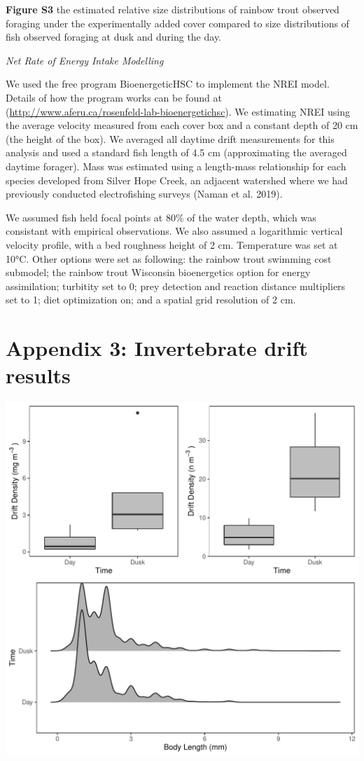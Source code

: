 \documentclass[]{article}
\begin{document}
\textbf{Figure S3} the estimated relative size distributions of rainbow
trout observed foraging under the experimentally added cover compared to
size distributions of fish observed foraging at dusk and during the day.

\emph{Net Rate of Energy Intake Modelling}

We used the free program BioenergeticHSC to implement the NREI model.
Details of how the program works can be found at
(\url{http://www.aferu.ca/rosenfeld-lab-bioenergetichsc}). We estimating
NREI using the average velocity measured from each cover box and a
constant depth of 20 cm (the height of the box). We averaged all daytime
drift measurements for this analysis and used a standard fish length of
4.5 cm (approximating the averaged daytime forager). Mass was estimated
using a length-mass relationship for each species developed from Silver
Hope Creek, an adjacent watershed where we had previously conducted
electrofishing surveys (Naman et al. 2019).

We assumed fish held focal points at 80\% of the water depth, which was
consistant with empirical observations. We also assumed a logarithmic
vertical velocity profile, with a bed roughness height of 2 cm.
Temperature was set at 10°C. Other options were set as following: the
rainbow trout swimming cost submodel; the rainbow trout Wisconsin
bioenergetics option for energy assimilation; turbitity set to 0; prey
detection and reaction distance multipliers set to 1; diet optimization
on; and a spatial grid resolution of 2 cm.

\clearpage

\section{Appendix 3: Invertebrate drift
results}\label{appendix-3-invertebrate-drift-results}

\includegraphics{./Final_figures/Appendix_S4.pdf}
\end{document}
